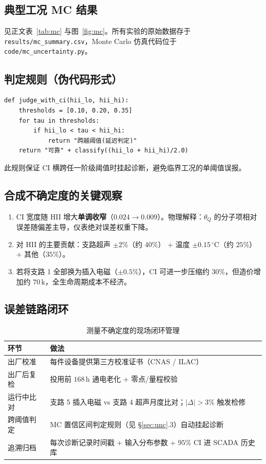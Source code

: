 \documentclass[11pt,a4paper]{ctexart}
\begin{document}
\subsection{典型工况 MC 结果}
见正文表~\ref{tab:mc} 与图~\ref{fig:mc}。所有实验的原始数据存于 \texttt{results/mc\_summary.csv}，Monte Carlo 仿真代码位于 \texttt{code/mc\_uncertainty.py}。

\subsection{判定规则（伪代码形式）}
\begin{verbatim}
def judge_with_ci(hii_lo, hii_hi):
    thresholds = [0.10, 0.20, 0.35]
    for tau in thresholds:
        if hii_lo < tau < hii_hi:
            return "跨越阈值(延迟判定)"
    return "可靠" + classify((hii_lo + hii_hi)/2.0)
\end{verbatim}
此规则保证 CI 横跨任一阶级阈值时挂起诊断，避免临界工况的单阈值误报。

\subsection{合成不确定度的关键观察}
\begin{enumerate}[leftmargin=*,itemsep=1pt]
    \item CI 宽度随 HII 增大\textbf{单调收窄}（$0.024\to 0.009$）。物理解释：$\theta_Q$ 的分子项相对误差随偏差主导，仪表绝对误差权重下降。
    \item 对 HII 的主要贡献：支路超声 $\pm 2\%$（约 $40\%$） $+$ 温度 $\pm 0.15\,\mathrm{^\circ C}$（约 $25\%$） $+$ 其他（$35\%$）。
    \item 若将支路 1 全部换为插入电磁（$\pm 0.5\%$），CI 可进一步压缩约 $30\%$，但造价增加约 \textyen $70\,\mathrm{k}$，全生命周期成本不经济。
\end{enumerate}

\subsection{误差链路闭环}

\begin{table}[H]
\centering
\caption{测量不确定度的现场闭环管理}
\small
\begin{tabular}{lp{8.5cm}}
\toprule
环节 & 做法 \\
\midrule
出厂校准      & 每件设备提供第三方校准证书（CNAS / ILAC） \\
出厂后复检    & 投用前 $168\,\mathrm{h}$ 通电老化 $+$ 零点/量程校验 \\
运行中比对    & 支路 5 插入电磁 vs 支路 4 超声月度比对；$|\Delta|>3\%$ 触发检修~\cite{en1434} \\
跨阈值判定    & MC 置信区间判定规则（见 §\ref{sec:unc}.3）自动挂起诊断 \\
追溯归档      & 每次诊断记录时间戳 + 输入分布参数 + $95\%$ CI 进 SCADA 历史库 \\
\bottomrule
\end{tabular}
\end{table}
\end{document}
